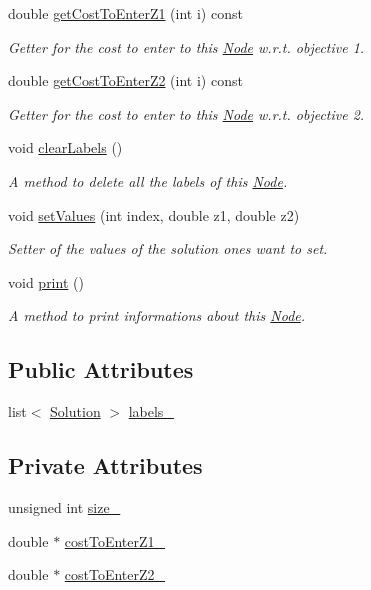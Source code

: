 \begin{DoxyCompactItemize}
double \hyperlink{classNode_a40f66cc9eee0122579a7037c2f46738a}{get\-Cost\-To\-Enter\-Z1} (int i) const 
\begin{DoxyCompactList}\small\item\em \-Getter for the cost to enter to this {\ttfamily \hyperlink{classNode}{\-Node}} w.\-r.\-t. objective 1. \end{DoxyCompactList}\item 
double \hyperlink{classNode_afb0ab41d4cc79d499916da3f594e15d2}{get\-Cost\-To\-Enter\-Z2} (int i) const 
\begin{DoxyCompactList}\small\item\em \-Getter for the cost to enter to this {\ttfamily \hyperlink{classNode}{\-Node}} w.\-r.\-t. objective 2. \end{DoxyCompactList}\item 
void \hyperlink{classNode_a27080467d8fc27274ebe1dc72bdc6fdc}{clear\-Labels} ()
\begin{DoxyCompactList}\small\item\em \-A method to delete all the labels of this {\ttfamily \hyperlink{classNode}{\-Node}}. \end{DoxyCompactList}\item 
void \hyperlink{classNode_a99306b6ebed472f44add46894b5c0329}{set\-Values} (int index, double z1, double z2)
\begin{DoxyCompactList}\small\item\em \-Setter of the values of the solution ones want to set. \end{DoxyCompactList}\item 
void \hyperlink{classNode_a68513b404648b1cf7d53b568a590ab81}{print} ()
\begin{DoxyCompactList}\small\item\em \-A method to print informations about this {\ttfamily \hyperlink{classNode}{\-Node}}. \end{DoxyCompactList}\end{DoxyCompactItemize}
\subsection*{\-Public \-Attributes}
\begin{DoxyCompactItemize}
\item 
list$<$ \hyperlink{classSolution}{\-Solution} $>$ \hyperlink{classNode_aaed9b5a5f87464cf60d1026b065cbb60}{labels\-\_\-}
\end{DoxyCompactItemize}
\subsection*{\-Private \-Attributes}
\begin{DoxyCompactItemize}
\item 
unsigned int \hyperlink{classNode_a9df2977b4bba73b9bd419f156e1668c8}{size\-\_\-}
\item 
double $\ast$ \hyperlink{classNode_a0d70213bcef4604f06d2bb5694ba725d}{cost\-To\-Enter\-Z1\-\_\-}
\item 
double $\ast$ \hyperlink{classNode_ae12a8704dddd4e3557927ea8d5c04b8a}{cost\-To\-Enter\-Z2\-\_\-}
\end{DoxyCompactItemize}


